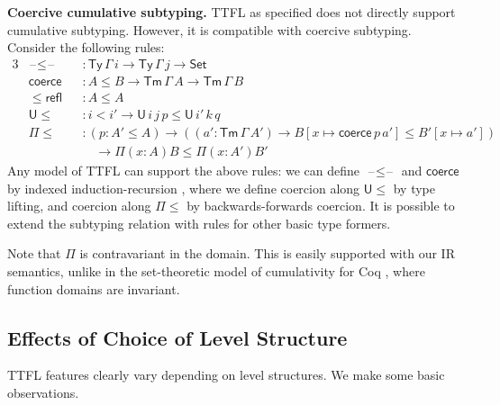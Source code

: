 \documentclass[a4paper,UKenglish,cleveref, autoref, thm-restate]{lipics-v2021}
\theoremstyle{remark}
\theoremstyle{definition}
\newcommand{\Seti}{\mathsf{Set}}
\newcommand{\Ty}{\mathsf{Ty}}
\newcommand{\Tm}{\mathsf{Tm}}
\newcommand{\U}{\mathsf{U}}
\newcommand{\blank}{\mathord{\hspace{1pt}\text{--}\hspace{1pt}}}
\renewcommand{\U}{\mathsf{U}}
\newcommand{\msf}[1]{\mathsf{#1}}
\begin{document}
\textbf{Coercive cumulative subtyping.}
TTFL as specified does not directly support cumulative subtyping. However, it is
compatible with coercive subtyping. Consider the following rules:
\begin{alignat*}{3}
  &\blank\!\leq\!\blank &&: \Ty\,\Gamma\,i \to \Ty\,\Gamma\,j \to \Seti\\
  &\msf{coerce} &&: A \leq B \to \Tm\,\Gamma\,A \to \Tm\,\Gamma\,B\\
  &\leq\!\msf{refl} &&: A \leq A \\
  &\U\!\leq    &&: i < i' \to \U\,i\,j\,p \leq \U\,i'\,k\,q\\
  &\Pi\!\leq   &&: (p : A' \leq A) \to ((a' : \Tm\,\Gamma\,A')
  \to B[x \mapsto \msf{coerce}\,p\,a'] \leq B'[x \mapsto a'])\\
  & && \hspace{1em} \to \Pi(x : A) B \leq \Pi (x : A') B'
\end{alignat*}
Any model of TTFL can support the above rules: we can define
$\blank\!\leq\!\blank$ and $\msf{coerce}$ by indexed induction-recursion
\cite{indexedir}, where we define coercion along $\U\!\leq$ by type lifting, and
coercion along $\Pi\!\leq$ by backwards-forwards coercion. It is possible to
extend the subtyping relation with rules for other basic type formers.

Note that $\Pi$ is contravariant in the domain. This is easily supported
with our IR semantics, unlike in the set-theoretic model of cumulativity for Coq
\cite{timany18cumulative}, where function domains are invariant.

\subsection{Effects of Choice of Level Structure}

TTFL features clearly vary depending on level structures. We make some basic
observations.
\end{document}

